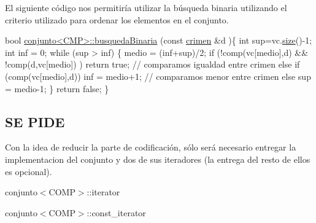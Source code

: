 El siguiente código nos permitiría utilizar la búsqueda binaria utilizando el criterio utilizado para ordenar los elementos en el conjunto. 
\begin{DoxyCode}
\textcolor{keywordtype}{bool} \hyperlink{classconjunto}{conjunto<CMP>::busquedaBinaria} (\textcolor{keyword}{const} \hyperlink{classcrimen}{crimen} &d )\{
    \textcolor{keywordtype}{int} sup=vc.\hyperlink{classconjunto_af9962de5f6425f2030dc0e63015f85b3}{size}()-1;
    \textcolor{keywordtype}{int} inf = 0;
    \textcolor{keywordflow}{while} (sup > inf) \{
      medio = (inf+sup)/2;
      \textcolor{keywordflow}{if} (!comp(vc[medio],d) && !comp(d,vc[medio]) ) \textcolor{keywordflow}{return} \textcolor{keyword}{true};  \textcolor{comment}{// comparamos igualdad entre crimen}
      \textcolor{keywordflow}{else} \textcolor{keywordflow}{if} (comp(vc[medio],d)) inf = medio+1; \textcolor{comment}{// comparamos menor entre crimen}
      \textcolor{keywordflow}{else} sup = medio-1;
    \}
    \textcolor{keywordflow}{return} \textcolor{keyword}{false};
\}
\end{DoxyCode}
\hypertarget{index_SP2}{}\subsection{S\+E P\+I\+D\+E}\label{index_SP2}
Con la idea de reducir la parte de codificación, sólo será necesario entregar la implementacion del conjunto y dos de sus iteradores (la entrega del resto de ellos es opcional). \begin{DoxyItemize}
\item conjunto$<$\+C\+O\+M\+P$>$\+::iterator \item conjunto$<$\+C\+O\+M\+P$>$\+::const\+\_\+iterator\end{DoxyItemize}

